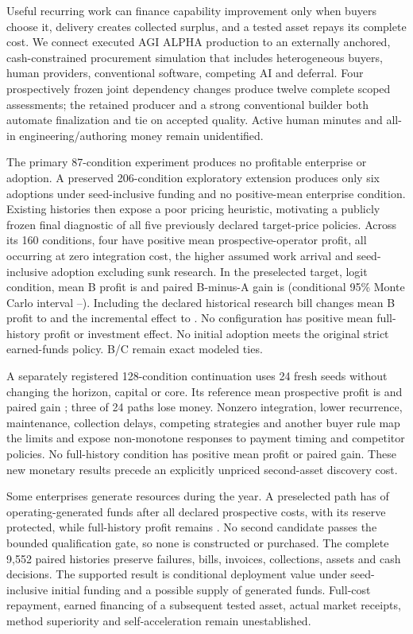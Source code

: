 Useful recurring work can finance capability improvement only when buyers choose it, delivery
creates collected surplus, and a tested asset repays its complete cost. We connect executed
AGI ALPHA production to an externally anchored, cash-constrained procurement simulation that includes
heterogeneous buyers, human providers, conventional software, competing AI and deferral.
Four prospectively frozen joint dependency changes produce twelve complete scoped assessments;
the retained producer and a strong conventional builder both automate finalization and tie on
accepted quality. Active human minutes and all-in engineering/authoring money remain unidentified.

The primary 87-condition experiment produces no profitable enterprise or adoption. A preserved
206-condition exploratory extension produces only six adoptions under seed-inclusive funding and no positive-mean
enterprise condition. Existing histories then expose a poor pricing heuristic, motivating a
publicly frozen final diagnostic of all five previously declared target-price policies.
Across its 160 conditions, four have positive mean prospective-operator profit, all occurring at
zero integration cost, the higher assumed work arrival and seed-inclusive adoption excluding sunk
research. In the preselected  target, logit condition, mean B profit is 
and paired B-minus-A gain is 
(conditional 95\% Monte Carlo interval --).
Including the declared historical research bill changes mean B profit to 
and the incremental effect to . No configuration has positive mean full-history
profit or investment effect. No initial adoption meets the original strict earned-funds policy. B/C remain exact modeled ties.

A separately registered 128-condition continuation uses 24 fresh seeds without changing the
horizon, capital or core. Its reference mean prospective profit is  and paired
gain ; three of 24 paths lose money. Nonzero integration, lower recurrence,
maintenance, collection delays, competing strategies and another buyer rule map the limits
and expose non-monotone responses to payment timing and competitor policies. No full-history condition has positive mean profit or paired gain. These new monetary
results precede an explicitly unpriced second-asset discovery cost.

Some enterprises generate resources during the year. A preselected path has  of
operating-generated funds after all declared prospective costs, with its reserve protected,
while full-history profit remains . No second candidate passes the bounded
qualification gate, so none is constructed or purchased. The complete 9,552 paired histories
preserve failures, bills, invoices, collections, assets and cash decisions. The supported result
is conditional deployment value under seed-inclusive initial funding and a possible supply of generated funds.
Full-cost repayment, earned financing of a subsequent tested asset, actual market receipts,
method superiority and self-acceleration remain unestablished.

